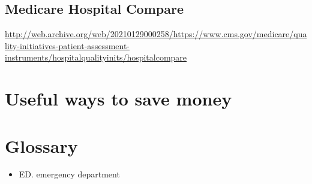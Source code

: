 \documentclass{article}
\begin{document}
\subsection{Medicare Hospital Compare}

\url{http://web.archive.org/web/20210129000258/https://www.cms.gov/medicare/quality-initiatives-patient-assessment-instruments/hospitalqualityinits/hospitalcompare}

\section{Useful ways to save money}

\section{Glossary}

\begin{itemize}
\item ED. emergency department

\end{itemize}

\printbibliography
\end{document}
